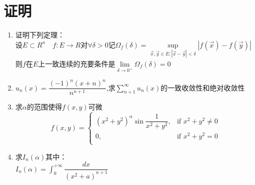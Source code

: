 \documentclass[12pt,a4paper]{article}
\begin{document}
	\section*{证明}
	\begin{enumerate}
		\item 证明下列定理：\\

			设$E \subset R^n \quad f:E \to R$对$\forall \delta >0$记$\Omega_f (\delta)=\sup\limits_{\vec{x},\vec{y} \in E ; |\vec{x}-\vec{y}|<\delta}|f(\vec{x})-f(\vec{y})|$
			则$f$在$E$上一致连续的充要条件是$\lim\limits_{\delta \to 0^+} \Omega_f (\delta)=0$

		
		\item $u_n(x)=\dfrac{(-1)^n(x+n)^n}{n^{n+1}}$,求$\sum\limits_{n+1}^{\infty} u_n(x)$的一致收敛性和绝对收敛性
		
		\item 求$\alpha$的范围使得$f(x,y)$可微
		\[
		f(x,y) =
		\begin{cases}
			(x^2+y^2)^{\alpha} \sin \dfrac{1}{x^2+y^2}, & \text{if } x^2+y^2 \neq 0 \\
			0, & \text{if } x^2+y^2 = 0 \\
		\end{cases}
		\]
		
		\item 求$I_n(\alpha)$其中：\\
		$I_n(\alpha)=\int_{0}^{+\infty} \dfrac{dx}{(x^2+a)^{n+1}}$
	\end{enumerate}
	
	
	
\end{document}
